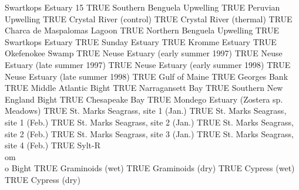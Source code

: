 \documentclass[11pt]{article}
\begin{document}
\begin{Schunk}
\begin{Soutput}
                Swartkops Estuary  15 
                                 TRUE 
          Southern Benguela Upwelling 
                                 TRUE 
                   Peruvian Upwelling 
                                 TRUE 
              Crystal River (control) 
                                 TRUE 
              Crystal River (thermal) 
                                 TRUE 
          Charca de Maspalomas Lagoon 
                                 TRUE 
          Northern Benguela Upwelling 
                                 TRUE 
                    Swartkops Estuary 
                                 TRUE 
                       Sunday Estuary 
                                 TRUE 
                       Kromme Estuary 
                                 TRUE 
                     Okefenokee Swamp 
                                 TRUE 
    Neuse Estuary (early summer 1997) 
                                 TRUE 
    Neuse Estuary (late summer 1997)  
                                 TRUE 
    Neuse Estuary (early summer 1998) 
                                 TRUE 
     Neuse Estuary (late summer 1998) 
                                 TRUE 
                        Gulf of Maine 
                                 TRUE 
                         Georges Bank 
                                 TRUE 
                Middle Atlantic Bight 
                                 TRUE 
                     Narragansett Bay 
                                 TRUE 
           Southern New England Bight 
                                 TRUE 
                      Chesapeake Bay  
                                 TRUE 
Mondego Estuary (Zostera sp. Meadows) 
                                 TRUE 
    St. Marks Seagrass, site 1 (Jan.) 
                                 TRUE 
    St. Marks Seagrass, site 1 (Feb.) 
                                 TRUE 
    St. Marks Seagrass, site 2 (Jan.) 
                                 TRUE 
    St. Marks Seagrass, site 2 (Feb.) 
                                 TRUE 
    St. Marks Seagrass, site 3 (Jan.) 
                                 TRUE 
    St. Marks Seagrass, site 4 (Feb.) 
                                 TRUE 
              Sylt-R{\\o}m{\\o} Bight 
                                 TRUE 
                     Graminoids (wet) 
                                 TRUE 
                     Graminoids (dry) 
                                 TRUE 
                        Cypress (wet) 
                                 TRUE 
                        Cypress (dry) 

\end{Soutput}
\end{Schunk}
\end{document}
